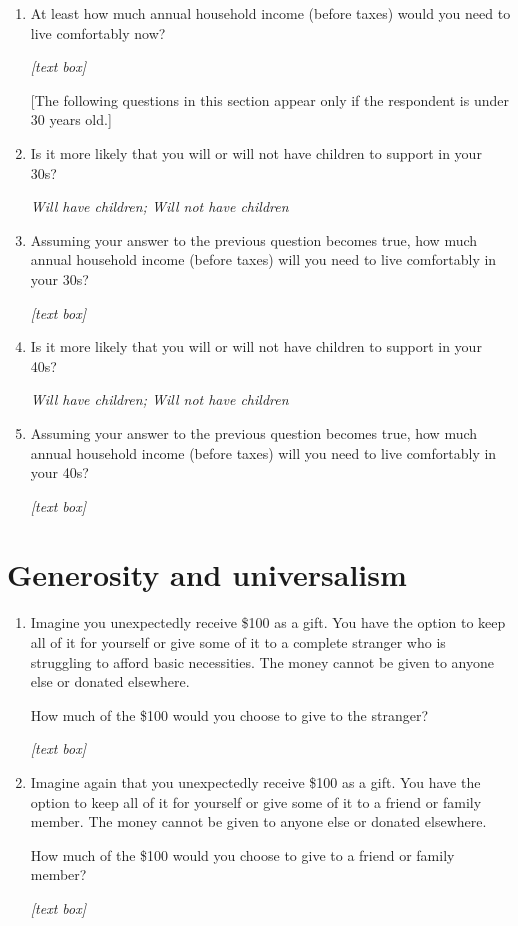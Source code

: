 \documentclass[11pt, headsepline]{article}
\begin{document}
\begin{enumerate}[resume]
    \item At least how much annual household income (before taxes) would you need to live comfortably now?

    \textit{[text box]}

    [The following questions in this section appear only if the respondent is under 30 years old.]
    
    \item Is it more likely that you will or  will not have children to support in your 30s?

    \textit{Will have children; Will not have children}

    \item Assuming your answer to the previous question becomes true, how much annual household income (before taxes) will you need to live comfortably in your 30s?

    \textit{[text box]}

    \item Is it more likely that you will or will not have children to support in your 40s?

    \textit{Will have children; Will not have children}

    \item Assuming your answer to the previous question becomes true, how much annual household income (before taxes) will you need to live comfortably in your 40s?

    \textit{[text box]}
    
\end{enumerate}

\section*{Generosity and universalism}

\begin{enumerate}[resume]

    \item Imagine you unexpectedly receive \$100 as a gift. You have the option to keep all of it for yourself or give some of it to a complete stranger who is struggling to afford basic necessities. The money cannot be given to anyone else or donated elsewhere.

    How much of the \$100 would you choose to give to the stranger?

    \textit{[text box]}

    \item Imagine again that you unexpectedly receive \$100 as a gift. You have the option to keep all of it for yourself or give some of it to a friend or family member. The money cannot be given to anyone else or donated elsewhere.

    How much of the \$100 would you choose to give to a friend or family member?

    \textit{[text box]}
    
\end{enumerate}
\end{document}
